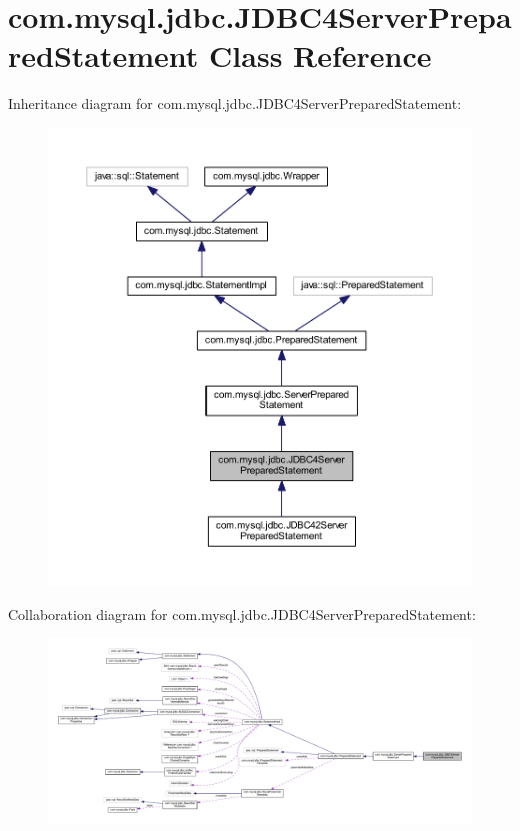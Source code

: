 \hypertarget{classcom_1_1mysql_1_1jdbc_1_1_j_d_b_c4_server_prepared_statement}{}\section{com.\+mysql.\+jdbc.\+J\+D\+B\+C4\+Server\+Prepared\+Statement Class Reference}
\label{classcom_1_1mysql_1_1jdbc_1_1_j_d_b_c4_server_prepared_statement}


Inheritance diagram for com.\+mysql.\+jdbc.\+J\+D\+B\+C4\+Server\+Prepared\+Statement\+:
\nopagebreak
\begin{figure}[H]
\begin{center}
\leavevmode
\includegraphics[width=350pt]{classcom_1_1mysql_1_1jdbc_1_1_j_d_b_c4_server_prepared_statement__inherit__graph}
\end{center}
\end{figure}


Collaboration diagram for com.\+mysql.\+jdbc.\+J\+D\+B\+C4\+Server\+Prepared\+Statement\+:
\nopagebreak
\begin{figure}[H]
\begin{center}
\leavevmode
\includegraphics[width=350pt]{classcom_1_1mysql_1_1jdbc_1_1_j_d_b_c4_server_prepared_statement__coll__graph}
\end{center}
\end{figure}
